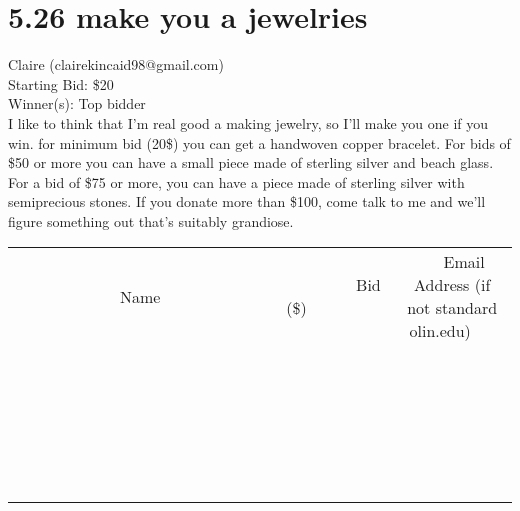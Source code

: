 \documentclass[11pt]{article}
\begin{document}
\section*{5.26 make you a jewelries}
Claire (clairekincaid98@gmail.com) \\
Starting Bid: \$20 \\
Winner(s): 
Top bidder \\
I like to think that I'm real good a making jewelry, so I'll make you one if you win.  for minimum bid (20\$) you can get a handwoven copper bracelet.  For bids of \$50 or more you can have a small piece made of sterling silver and beach glass.  For a bid of \$75 or more, you can have a piece made of sterling silver with semiprecious stones.  If you donate more than \$100, come talk to me and we'll figure something out that's suitably grandiose. \\[6ex]
\begin{tabular}{c c c}
~~~~~~~~~~~~~Name~~~~~~~~~~~~~ & ~~~~~~~~~Bid (\$)~~~~~~~~~ & ~~~Email Address (if not standard olin.edu)~~~ \\
 & & \\
\hline
 & & \\
\hline
 & & \\
\hline
 & & \\
\hline
 & & \\
\hline
 & & \\
\hline
 & & \\
\hline
 & & \\
\hline
 & & \\
\hline
 & & \\
\hline
 & & \\
\hline
 & & \\
\hline
 & & \\
\hline
 & & \\
\hline
 & & \\
\hline
 & & \\
\hline
 & & \\
\hline
 & & \\
\hline
 & & \\
\hline
 & & \\
\hline
 & & \\
\hline
 & & \\
\hline
 & & \\
\hline
 & & \\
\hline
 & & \\
\hline
 & & \\
\hline
\end{tabular}
\clearpage
\end{document}
